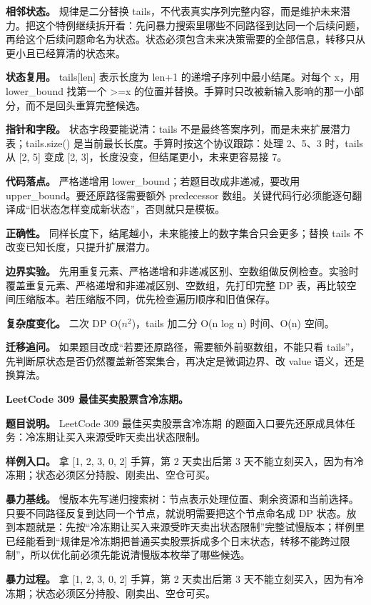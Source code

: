 \textbf{相邻状态。} 规律是二分替换 tails，不代表真实序列完整内容，而是维护未来潜力。把这个特例继续拆开看：先问暴力搜索里哪些不同路径到达同一个后续问题，再给这个后续问题命名为状态。状态必须包含未来决策需要的全部信息，转移只从更小且已经算清的状态来。

\textbf{状态复用。} tails[len] 表示长度为 len+1 的递增子序列中最小结尾。对每个 x，用 lower\_bound 找第一个 >=x 的位置并替换。手算时只改被新输入影响的那一小部分，而不是回头重算完整候选。

\textbf{指针和字段。} 状态字段要能说清：tails 不是最终答案序列，而是未来扩展潜力表；tails.size() 是当前最长长度。手算时按这个协议跟踪：处理 2、5、3 时，tails 从 [2, 5] 变成 [2, 3]，长度没变，但结尾更小，未来更容易接 7。

\textbf{代码落点。} 严格递增用 lower\_bound；若题目改成非递减，要改用 upper\_bound。要还原路径需要额外 predecessor 数组。关键代码行必须能逐句翻译成“旧状态怎样变成新状态”，否则就只是模板。

\textbf{正确性。} 同样长度下，结尾越小，未来能接上的数字集合只会更多；替换 tails 不改变已知长度，只提升扩展潜力。

\textbf{边界实验。} 先用重复元素、严格递增和非递减区别、空数组做反例检查。实验时覆盖重复元素、严格递增和非递减区别、空数组，先打印完整 DP 表，再比较空间压缩版本。若压缩版不同，优先检查遍历顺序和旧值保存。

\textbf{复杂度变化。} 二次 DP O(\ensuremath{n^{2}})，tails 加二分 O(n log n) 时间、O(n) 空间。

\textbf{迁移追问。} 如果题目改成“若要还原路径，需要额外前驱数组，不能只看 tails”，先判断原状态是否仍然覆盖新答案集合，再决定是微调边界、改 value 语义，还是换算法。

\noindent\textbf{LeetCode 309 最佳买卖股票含冷冻期。}

\textbf{题目说明。} LeetCode 309 最佳买卖股票含冷冻期 的题面入口要先还原成具体任务：冷冻期让买入来源受昨天卖出状态限制。

\textbf{样例入口。} 拿 [1, 2, 3, 0, 2] 手算，第 2 天卖出后第 3 天不能立刻买入，因为有冷冻期；状态必须区分持股、刚卖出、空仓可买。

\textbf{暴力基线。} 慢版本先写递归搜索树：节点表示处理位置、剩余资源和当前选择。只要不同路径反复到达同一个节点，就说明需要把这个节点命名成 DP 状态。放到本题就是：先按“冷冻期让买入来源受昨天卖出状态限制”完整试慢版本；样例里已经能看到“规律是冷冻期把普通买卖股票拆成多个日末状态，转移不能跨过限制”，所以优化前必须先能说清慢版本枚举了哪些候选。

\textbf{暴力过程。} 拿 [1, 2, 3, 0, 2] 手算，第 2 天卖出后第 3 天不能立刻买入，因为有冷冻期；状态必须区分持股、刚卖出、空仓可买。

